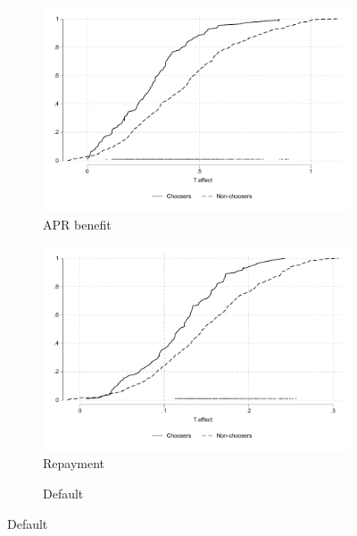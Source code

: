 \documentclass[oneside,11pt]{article}
\begin{document}
    
\begin{figure}[H]
    \caption{Negative selection on treatment effects}
    \label{benefit_vs_choice_cdf}
    \begin{center}
    \begin{subfigure}{0.475\textwidth}
        \caption{APR benefit}
        \centering
        \includegraphics[width=\textwidth]{Figuras/cdf_predchoose_tau_apr.pdf}
    \end{subfigure}
    \begin{subfigure}{0.475\textwidth}
        \caption{Repayment}
        \centering
        \includegraphics[width=\textwidth]{Figuras/cdf_predchoose_tau_des.pdf}
    \end{subfigure}
    \begin{subfigure}{0.475\textwidth}
        \caption{Default}
        \centering

\end{subfigure}
\end{center}
\end{figure}
\end{document}
